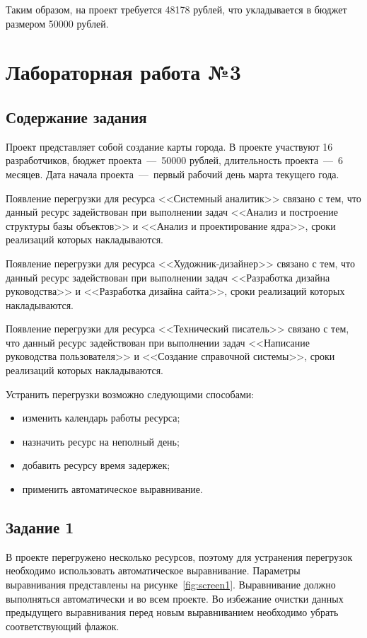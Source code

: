 Таким образом, на проект требуется 48178 рублей, что укладывается в бюджет размером 50000 рублей.

\section{Лабораторная работа №3}

\subsection{Содержание задания}
Проект представляет собой создание карты города.
В проекте участвуют 16 разработчиков, бюджет проекта~---~50000 рублей, длительность проекта~---~6 месяцев.
Дата начала проекта~---~первый рабочий день марта текущего года.

Появление перегрузки для ресурса <<Системный аналитик>> связано с тем, что данный ресурс задействован при выполнении задач <<Анализ и построение структуры базы объектов>> и <<Анализ и проектирование ядра>>, сроки реализаций которых накладываются.

Появление перегрузки для ресурса <<Художник-дизайнер>> связано с тем, что данный ресурс задействован при выполнении задач <<Разработка дизайна руководства>> и <<Разработка дизайна сайта>>, сроки реализаций которых накладываются.

Появление перегрузки для ресурса <<Технический писатель>> связано с тем, что данный ресурс задействован при выполнении задач <<Написание руководства пользователя>> и <<Создание справочной системы>>, сроки реализаций которых накладываются.

Устранить перегрузки возможно следующими способами:
\begin{itemize}[label=---]
	\item изменить календарь работы ресурса;
	\item назначить ресурс на неполный день;
	\item добавить ресурсу время задержек;
	\item применить автоматическое выравнивание.
\end{itemize}

\subsection{Задание 1}

В проекте перегружено несколько ресурсов, поэтому для устранения перегрузок необходимо использовать автоматическое выравнивание.
Параметры выравнивания представлены на рисунке~\ref{fig:screen1}.
Выравнивание должно выполняться автоматически и во всем проекте. Во избежание очистки данных предыдущего выравнивания перед новым выравниванием необходимо убрать соответствующий флажок.


